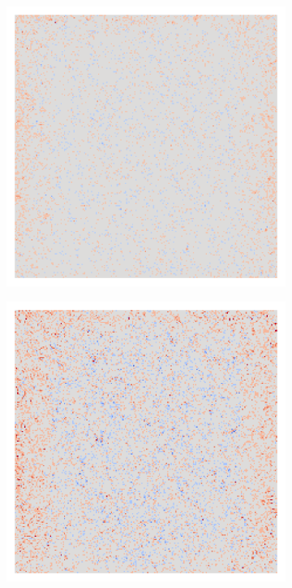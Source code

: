 \begin{figure}[H]
\begin{subfigure}{0.095\linewidth}
    \end{subfigure}\hfill%
    \begin{subfigure}{0.095\linewidth}
        \centering
        \includegraphics[height=1\linewidth]{01-images/05-resultate/uap_resnet18/uap0-resnet18-mri_data-n200-robustificationslevel3.png}
    \end{subfigure}\hfill%
    \begin{subfigure}{0.095\linewidth}
        \centering
        \includegraphics[height=1\linewidth]{01-images/05-resultate/uap_resnet18/uap0-resnet18-mri_data-n200-robustificationslevel4.png}

\end{subfigure}
\end{figure}
